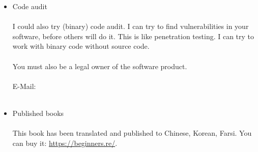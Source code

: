 {\begin{minipage}{0.9\linewidth}
\begin{itemize}
\item Code audit\\
\\
I could also try (binary) code audit.
I can try to find vulnerabilities in your software, before others will do it.
This is like penetration testing.
I can try to work with binary code without source code.\\
\\
You must also be a legal owner of the software product.\\
\\
E-Mail: \EMAILS \\
\\
\item Published books\\
\\
This book has been translated and published to
Chinese,
Korean,
Farsi.
You can buy it: \url{https://beginners.re/}.

\end{itemize}

\end{minipage}}


